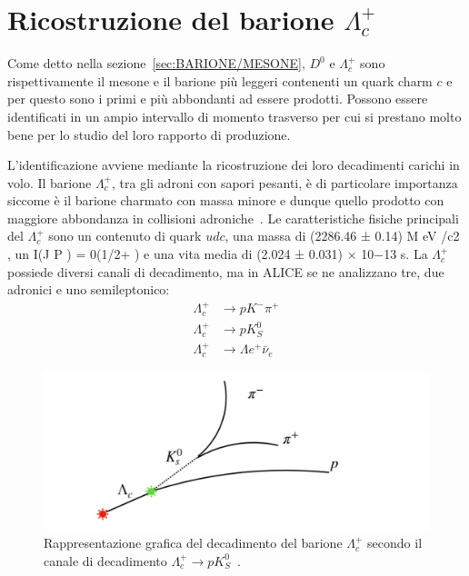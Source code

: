 \chapter{Ricostruzione del barione $\Lambda^{+}_{c}$}
\label{cha:3-LAMBDA+c}
Come detto nella sezione~\ref{sec:BARIONE/MESONE}, $D^{0}$ e $\Lambda_{c}^{+}$ sono rispettivamente il mesone e il barione più leggeri contenenti un quark charm $c$ e per questo sono i primi e più abbondanti ad essere prodotti. Possono essere identificati in un ampio intervallo di momento trasverso per cui si prestano molto bene per lo studio del loro rapporto di produzione.

L’identificazione avviene mediante la ricostruzione dei loro decadimenti carichi in volo. Il barione $\Lambda_{c}^{+}$, tra gli adroni con sapori pesanti, è di particolare importanza siccome è il barione charmato con massa minore e dunque quello prodotto con maggiore abbondanza in collisioni adroniche~\cite{Strazzi_2019}. Le caratteristiche fisiche principali del $\Lambda_{c}^{+}$ sono un contenuto di quark $udc$, una massa di \qty[]{}{} (2286.46 ± 0.14) M eV /c2 , un I(J P ) = 0(1/2+ ) e una vita media di \qty[]{}{} (2.024 ± 0.031) × 10−13 s. La $\Lambda_{c}^{+}$ possiede diversi canali di decadimento, ma in ALICE se ne analizzano tre, due adronici e uno semileptonico:
\begin{align}
    \Lambda_{c}^{+} & \to p K^{-} \pi^{+} 
    \label{eq:3-Lambda+c-decay-channel-pKpi}\\
    \Lambda_{c}^{+} & \to p K^{0}_{S}
    \label{eq:3-Lambda+c-decay-channel-pK0S} \\
    \Lambda_{c}^{+} & \to \Lambda e^{+} \bar{\nu}_{e}
    \label{eq:3-Lambda+c-decay-channel-Lambdae+nue}
\end{align}

\begin{figure}[t]
    \centering
    \includegraphics[width=1\linewidth]{res/fig/3-chapter/1-Lambda+c-decay.jpg}
    \caption{Rappresentazione grafica del decadimento del barione $\Lambda_{c}^{+}$ secondo il canale di decadimento $\Lambda_{c}^{+} \to p K^{0}_{S}$~\cite{Fusconi_2022}.}
    \label{fig:3-1-Lambda+c-decay}
\end{figure}

